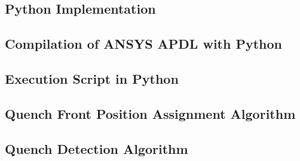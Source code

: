 \documentclass[11pt,a4paper]{report}
\begin{document}
\begin{appendices}
\clearpage
\chapter{Python Implementation}
\section{Compilation of ANSYS APDL with Python}
\label{appendix:python_ansys_compilation}


\section{Execution Script in Python}
\label{appendix:execution_script_python}


\section{Quench Front Position Assignment Algorithm}
\label{appendix:python_nodes_search_algorithm}


\section{Quench Detection Algorithm}
\label{appendix:python_quench_detection_algorithm}


\end{appendices}

\clearpage


\end{document}
